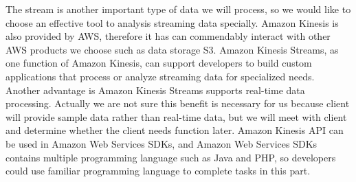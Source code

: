         \noindent The stream is another important type of data we will process, so we would like to choose an effective tool to analysis streaming data specially. Amazon Kinesis is also provided by AWS, therefore it has can commendably interact with other AWS products we choose such as data storage S3. Amazon Kinesis Streams, as one function of Amazon Kinesis, can support developers to build custom applications that process or analyze streaming data for specialized needs\cite{Z6}. Another advantage is Amazon Kinesis Streams supports real-time data processing. Actually we are not sure this benefit is necessary for us because client will provide sample data rather than real-time data, but we will meet with client and determine whether the client needs function later. Amazon Kinesis API can be used in Amazon Web Services SDKs, and Amazon Web Services SDKs contains multiple programming language such as Java and PHP, so developers could use familiar programming language to complete tasks in this part.\\
